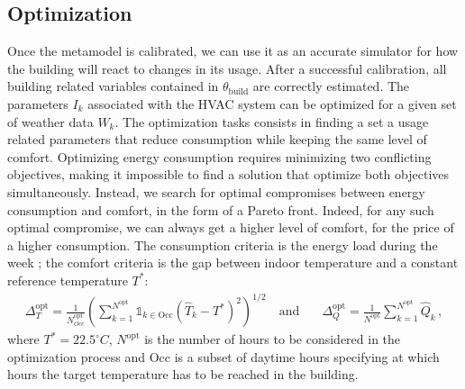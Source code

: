 \documentclass[12pt]{article}
\newcommand{\eqsp}{\,}
\begin{document}
\subsection{Optimization}
Once the metamodel is calibrated, we can use it as an accurate simulator for how the building will react to changes in its usage. After a successful calibration, all building related variables contained in $\theta_{\mathrm{build}}$ are correctly estimated. The parameters $I_k$ associated with the HVAC system can be optimized for a given set of weather data $W_k$. The optimization tasks consists in finding a set a usage related parameters that reduce consumption while keeping the same level of comfort. Optimizing energy consumption requires minimizing two conflicting objectives, making it impossible to find a solution that optimize both objectives simultaneously. Instead, we search for optimal compromises between energy consumption and comfort, in the form of a Pareto front. Indeed, for any such optimal compromise, we can always get a higher level of comfort, for the price of a higher consumption. The consumption criteria is the energy load during the week ; the comfort criteria is the gap between indoor temperature and a constant reference temperature $T^*$:
\begin{align*}
    \Delta^{\mathrm{opt}}_T = \frac{1}{N^{\mathrm{opt}}_{Occ}}\left(\sum_{k=1}^{N^{\mathrm{opt}}} \mathds{1}_{k\in \mathrm{Occ}}(\widehat T_k - T^*)^2\right)^{1/2}\quad\mathrm{and} & \quad
    \Delta^{\mathrm{opt}}_Q = \frac{1}{N^{\mathrm{opt}}} \sum_{k=1}^{N^{\mathrm{opt}}} \widehat Q_k\,,
\end{align*}
where $T^*=22.5^{\circ}C$, $N^{\mathrm{opt}}$ is the number of hours to be considered in the optimization process and $\mathrm{Occ}$ is a subset of daytime hours specifying at which hours the target temperature has to be reached in the building.
%
\end{document}
